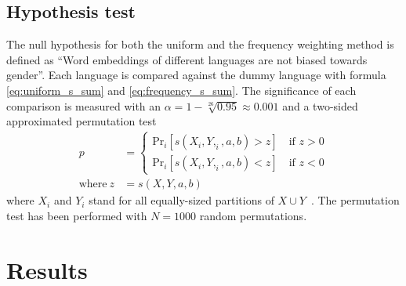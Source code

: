 \subsection{Hypothesis test}
The null hypothesis for both the uniform and the frequency weighting method is
defined as ``Word embeddings of different languages are not biased towards gender''.
Each language is compared against the dummy language with formula \eqref{eq:uniform_s_sum}
and \eqref{eq:frequency_s_sum}. 
The significance of each comparison is measured with an 
${\alpha = 1-\sqrt[26]{0.95} \approx 0.001}$ and
a two-sided approximated permutation test
\begin{align}\label{eq:setup_p_test}
    p &= \begin{cases}
    \text{Pr}_i[s(X_i, Y,_i, a, b) > z] \quad \text{if } z > 0 \\
    \text{Pr}_i[s(X_i, Y,_i, a, b) < z] \quad \text{if } z < 0
\end{cases}\nonumber \\
\text{where} \ z &= s(X,Y,a,b)
\end{align}
where $X_i$ and $Y_i$ stand for all equally-sized partitions of
$X \cup Y$~\parencite{caliskan_2017_semantics_language_corpora}. The permutation test has
been performed with $N = 1000$ random permutations.

\section{Results}
%

